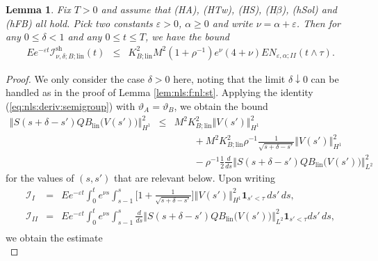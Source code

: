\documentclass[10pt]{articleHJ}
\newcommand{\e}{\ensuremath{\varepsilon}}
\newcommand{\norm}[1]{\left\Vert#1\right\Vert}		%
\newcommand{\sref}[1]{(\ref{#1})}                       %
\newtheorem{lem}[thm]{Lemma}
\numberwithin{equation}{section}
\begin{document}
\begin{lem}
\label{lem:nls:b:lin:st:i}
Fix $T > 0$ and assume that (HA), (HTw), (HS),
(H$\beta$),
(hSol) and (hFB) all hold.
Pick two constants $\e > 0$, $\alpha \ge 0$
and write $\nu = \alpha + \e$.
Then for
any $0 \le \delta < 1$
and any $0 \le t \le T$,
we have the bound
\begin{equation}
\begin{array}{lcl}
E
e^{-\e t} \mathcal{I}^{\mathrm{sh}}_{\nu,\delta;B;\mathrm{lin}}(t)
 & \le &     K_{B;\mathrm{lin}}^2 M^2 (1 + \rho^{-1}) e^{\nu}( 4  + \nu )
  E  N_{\e,\alpha;II}(t \wedge \tau).
\end{array}
\end{equation}
\end{lem}
\begin{proof}
We only consider the case $\delta > 0$ here,
noting that the limit $\delta \downarrow 0$
can be handled as in the proof of
Lemma \ref{lem:nls:f:nl:st}.
Applying the identity \sref{eq:nls:deriv:semigroup}
with $\vartheta_A = \vartheta_B$,
we obtain the bound
\begin{equation}
\begin{array}{lcl}
\norm{S(s+\delta -s')Q B_{\mathrm{lin}}\big(V(s')\big) }_{H^1}^2
& \le & M^2 K_{B;\mathrm{lin}}^2 \norm{V(s')}_{H^1}^2
\\[0.2cm]
& & \qquad
 +  M^2 K_{B;\mathrm{lin}}^2 \rho^{-1} \frac{1}{\sqrt{s + \delta - s'} }
    \norm{V(s')}_{H^1}^2
\\[0.2cm]
& & \qquad
  - \rho^{-1} \frac{1}{2}
  \frac{d}{ds}
    \norm{ S(s + \delta -s') Q B_{\mathrm{lin}}\big(V(s')\big) }_{L^2}^2
\end{array}
\end{equation}
for the values of $(s,s')$ that are relevant below.
Upon writing
\begin{equation}
\begin{array}{lcl}
\mathcal{I}_{I}
 & = &
    E e^{-\e t  } \int_0^{t}
   e^{  \nu s } \int_{s  - 1}^{s }
       \big[ 1 + \frac{1}{\sqrt{s + \delta - s'} } ]
          \norm{V(s')}_{H^1}^2  \mathbf{1}_{s' < \tau} \, ds' \, ds ,
\\[0.2cm]
\mathcal{I}_{II}
& = &
E e^{-\e t } \int_0^{t}
   e^{\nu s } \int_{s - 1 }^{s }
    \frac{d}{ds}
    \norm{  S(s + \delta -s') Q B_{\mathrm{lin}}\big(V(s')\big) }_{L^2}^2  \mathbf{1}_{s' < \tau} ds'  \, ds ,
\\[0.2cm]
\end{array}
\end{equation}
we obtain the estimate
\begin{equation}

\end{equation}
\end{proof}
\end{document}
